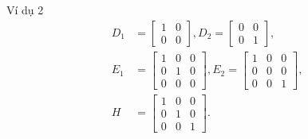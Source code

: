 \begin{frame}{Ví dụ 2}
    \begin{align}
        D_{1} & =\left[\begin{array}{cc}
        1 & 0\\
        0 & 0
        \end{array}\right],D_{2}=\left[\begin{array}{cc}
        0 & 0\\
        0 & 1
        \end{array}\right],\\
        E_{1} & =\left[\begin{array}{ccc}
        1 & 0 & 0\\
        0 & 1 & 0\\
        0 & 0 & 0
        \end{array}\right],E_{2}=\left[\begin{array}{ccc}
        1 & 0 & 0\\
        0 & 0 & 0\\
        0 & 0 & 1
        \end{array}\right],\\
        H & =\left[\begin{array}{ccc}
        1 & 0 & 0\\
        0 & 1 & 0\\
        0 & 0 & 1
        \end{array}\right].
    \end{align}
\end{frame}


